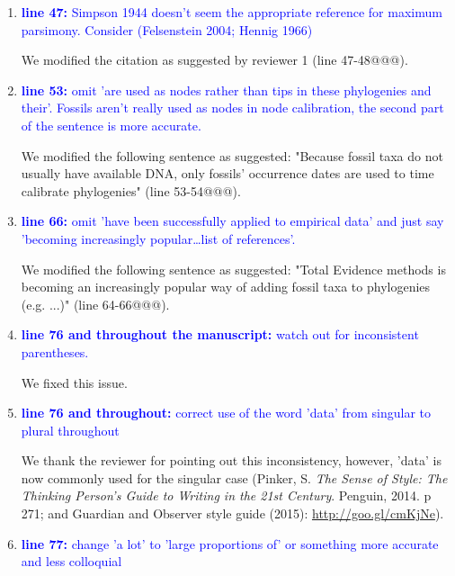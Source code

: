 \documentclass[12pt,letterpaper]{article}
\begin{document}
\begin{enumerate}
\item{\textcolor{blue}{\textbf{line 47:} Simpson 1944 doesn't seem the appropriate reference for maximum parsimony. Consider (Felsenstein 2004; Hennig 1966) }}

We modified the citation as suggested by reviewer 1 (line 47-48@@@).

\item{\textcolor{blue}{\textbf{line 53:} omit 'are used as nodes rather than tips in these phylogenies and their'. Fossils aren't really used as nodes in node calibration, the second part of the sentence is more accurate.}}

We modified the following sentence as suggested: "Because fossil taxa do not usually have available DNA, only fossils' occurrence dates are used to time calibrate phylogenies" (line 53-54@@@).

\item{\textcolor{blue}{\textbf{line 66:} omit 'have been successfully applied to empirical data' and just say 'becoming increasingly popular…list of references'. }}

We modified the following sentence as suggested: "Total Evidence methods is becoming an increasingly popular way of adding fossil taxa to phylogenies (e.g. ...)" (line 64-66@@@).

\item{\textcolor{blue}{\textbf{line 76 and throughout the manuscript:} watch out for inconsistent parentheses.}}

We fixed this issue.

\item{\textcolor{blue}{\textbf{line 76 and throughout:} correct use of the word 'data' from singular to plural throughout}}

We thank the reviewer for pointing out this inconsistency, however, 'data' is now commonly used for the singular case (Pinker, S. \textit{The Sense of Style: The Thinking Person's Guide to Writing in the 21st Century}. Penguin, 2014. p 271; and Guardian and Observer style guide (2015): \url{http://goo.gl/cmKjNe}).

\item{\textcolor{blue}{\textbf{line 77:} change 'a lot' to 'large proportions of' or something more accurate and less colloquial}}


\end{enumerate}
\end{document}
